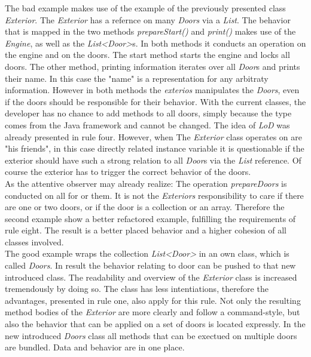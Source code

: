 The bad example makes use of the example of the previously presented class \textit{Exterior}. The \textit{Exterior} has a refernce on many \textit{Doors} via a \textit{List}. The behavior that is mapped in the two methods \textit{prepareStart()} and \textit{print()} makes use of the \textit{Engine}, as well as the \textit{List<Door>}s. In both methods it conducts an operation on the engine and on the doors. The start method starts the engine and locks all doors. The other method, printing information iterates over all \textit{Door}s and prints their name. In this case the "name" is a representation for any arbitraty information. However in both methods the \textit{exterios} manipulates the \textit{Doors}, even if the doors should be responsible for their behavior. With the current classes, the developer has no chance to add methods to all doors, simply because the type comes from the Java framework and cannot be changed. The idea of \textit{LoD} was already presented in rule four. However, when The \textit{Exterior} class operates on are "his friends", in this case directly related instance variable it is questionable if the exterior should have such a strong relation to all \textit{Door}s via the \textit{List} reference. Of course the exterior has to trigger the correct behavior of the doors. 
\\

As the attentive observer may already realize: The operation \textit{prepareDoors} is conducted on all for or them. It is not the \textit{Exteriors} responsibility to care if there are one or two doors, or if the door is a collection or an array. Therefore the second example show a better refactored example, fulfilling the requirements of rule eight. The result is a better placed behavior and a higher cohesion of all classes involved.
\\

The good example wraps the collection \textit{List<Door>} in an own class, which is called \textit{Doors}. In result the behavior relating to door can be pushed to that new introduced class. The readability and overview of the \textit{Exterior} class is increased tremendously by doing so. The class has less intentiations, therefore the advantages, presented in rule one, also apply for this rule. Not only the resulting method bodies of the \textit{Exterior} are more clearly and follow a command-style, but also the behavior that can be applied on a set of doors is located expressly.
In the new introduced \textit{Doors} class all methods that can be exectued on multiple doors are bundled. Data and behavior are in one place. 
\\

